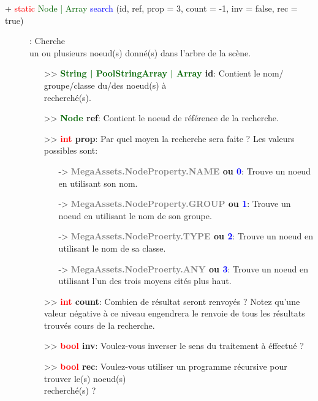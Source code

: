 \documentclass[a4paper, 11pt]{article}
\begin{document}
	\begin{description}
		\item [+ \textcolor{red}{static} \textcolor{darkgreen}{Node | Array} \textcolor{blue}{search} (id, 
		ref, prop = 3, count = -1, inv = false, rec = true)]: Cherche \\un ou plusieurs noeud(s) donné(s) 
		dans l'arbre de la scène.
		\begin{itemize}
			\item [>> \textbf{\textcolor{darkgreen}{String | PoolStringArray | Array} id}:] Contient le nom/
			groupe/classe du/des noeud(s) à \\recherché(s).
			\item [>> \textbf{\textcolor{darkgreen}{Node} ref}:] Contient le noeud de référence de la
			recherche.
			\item [>> \textbf{\textcolor{red}{int} prop}:] Par quel moyen la recherche sera faite ? 
			Les valeurs possibles sont:
			\begin{itemize}
				\item [-> \textbf{\textcolor{gray}{MegaAssets.NodeProperty.NAME} ou \textcolor{blue}{0}}:] 
				Trouve un noeud en utilisant son nom.
				\item [-> \textbf{\textcolor{gray}{MegaAssets.NodeProperty.GROUP} ou \textcolor{blue}{1}}:] 
				Trouve un noeud en utilisant le nom de son groupe.
				\item [-> \textbf{\textcolor{gray}{MegaAssets.NodeProerty.TYPE} ou \textcolor{blue}{2}}:] 
				Trouve un noeud en utilisant le nom de sa classe.
				\item [-> \textbf{\textcolor{gray}{MegaAssets.NodeProerty.ANY} ou \textcolor{blue}{3}}:] 
				Trouve un noeud en utilisant l'un des trois moyens cités plus haut.
			\end{itemize}
			\item [>> \textbf{\textcolor{red}{int} count}:] Combien de résultat seront renvoyés ? Notez 
			qu'une valeur négative à ce niveau engendrera le renvoie de tous les résultats trouvés cours de 
			la recherche.
			\item [>> \textbf{\textcolor{red}{bool} inv}:] Voulez-vous inverser le sens du traitement à 
			éffectué ?
			\item [>> \textbf{\textcolor{red}{bool} rec}:] Voulez-vous utiliser un programme récursive pour
			trouver le(s) noeud(s) \\recherché(s) ?\\
		\end{itemize}
	\end{description}
\end{document}
